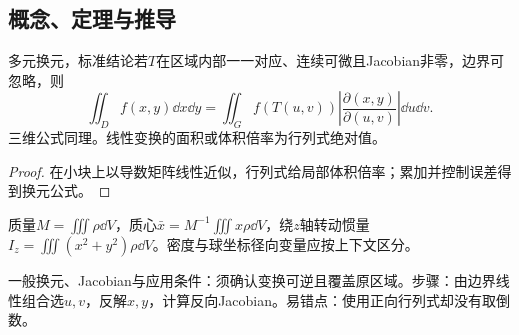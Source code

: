 \subsection{概念、定理与推导}

\begin{theorem}{多元换元，标准结论}若$T$在区域内部一一对应、连续可微且Jacobian非零，边界可忽略，则
\begin{equation}\iint_Df(x,y)\dd x\dd y=\iint_G f(T(u,v))\left|\dfrac{\partial(x,y)}{\partial(u,v)}\right|\dd u\dd v.\end{equation}
三维公式同理。线性变换的面积或体积倍率为行列式绝对值。\end{theorem}
\begin{proof}在小块上以导数矩阵线性近似，行列式给局部体积倍率；累加并控制误差得到换元公式。\end{proof}
质量$M=\iiint\rho\dd V$，质心$\bar x=M^{-1}\iiint x\rho\dd V$，绕$z$轴转动惯量$I_z=\iiint(x^2+y^2)\rho\dd V$。密度与球坐标径向变量应按上下文区分。

\begin{method}{一般换元、Jacobian与应用}条件：须确认变换可逆且覆盖原区域。步骤：由边界线性组合选$u,v$，反解$x,y$，计算反向Jacobian。易错点：使用正向行列式却没有取倒数。\end{method}
